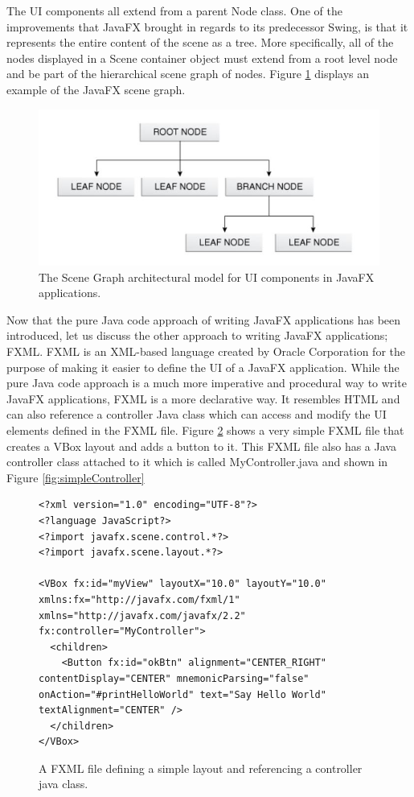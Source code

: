 The UI components all extend from a parent Node class. One of the improvements that JavaFX brought in regards to its predecessor Swing, is that it represents the entire content of the scene as a tree. More specifically, all of the nodes displayed in a Scene container object must extend from a root level node and be part of the hierarchical scene graph of nodes. Figure \ref{fig:javafxSceneGraph}  displays an example of the JavaFX scene graph.
\begin{figure}[th]
\centering
\includegraphics[scale=0.5]{Figures/javafx_scenegraph.JPG}
\caption[JavaFX Scene Graph]{The Scene Graph architectural model for UI components in JavaFX applications.}
\label{fig:javafxSceneGraph}
\end{figure}

Now that the pure Java code approach of writing JavaFX applications has been introduced, let us discuss the other approach to writing JavaFX applications; FXML. FXML is an XML-based language created by Oracle Corporation for the purpose of making it easier to define the UI of a JavaFX application. While the pure Java code approach is a much more imperative and procedural way to write JavaFX applications, FXML is a more declarative way. It resembles HTML and can also reference a controller Java class which can access and modify the UI elements defined in the FXML file. Figure \ref{fig:simpleFXML} shows a very simple FXML file that creates a VBox layout and adds a button to it. This FXML file also has a Java controller class attached to it which is called MyController.java and shown in Figure \ref{fig:simpleController}

\begin{figure}[th]
\centering
\begin{lstlisting}
<?xml version="1.0" encoding="UTF-8"?>
<?language JavaScript?>
<?import javafx.scene.control.*?>
<?import javafx.scene.layout.*?>

<VBox fx:id="myView" layoutX="10.0" layoutY="10.0" xmlns:fx="http://javafx.com/fxml/1" xmlns="http://javafx.com/javafx/2.2" fx:controller="MyController">
  <children>
    <Button fx:id="okBtn" alignment="CENTER_RIGHT" contentDisplay="CENTER" mnemonicParsing="false" onAction="#printHelloWorld" text="Say Hello World" textAlignment="CENTER" />
  </children>
</VBox>
\end{lstlisting}
\caption[FXML example]{A FXML file defining a simple layout and referencing a controller java class.}
\label{fig:simpleFXML}
\end{figure}



